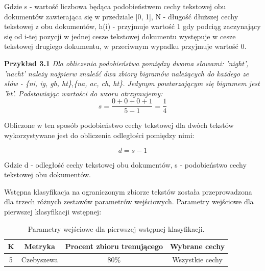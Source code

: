 \documentclass{classrep}
\begin{document}
Gdzie s - wartość liczbowa będąca podobieństwem cechy tekstowej obu dokumentów zawierająca się w przedziale [0, 1], N - długość dłuższej cechy tekstowej z obu dokumentów, h(i) - przyjmuje wartość 1 gdy podciąg zaczynający się od i-tej pozycji w jednej cesze tekstowej dokumentu występuje w cesze tekstowej drugiego dokumentu, w przeciwnym wypadku przyjmuje wartość 0.
\newline


\textbf{Przykład 3.1}\textit{
Dla obliczenia podobieństwa pomiędzy dwoma słowami: 'night', 'nacht' należy najpierw znaleźć dwa zbiory bigramów należących do każdego ze słów - \{ni, ig, gh, ht\},\{na, ac, ch, ht\}.
Jedynym powtarzającym się bigramem jest 'ht'. Podstawiając wartości do wzoru otrzymujemy:
\begin{equation} s = \frac {0 + 0 + 0 + 1}{5 - 1} = \frac{1}{4} \end{equation}
}

Obliczone w ten sposób podobieństwo cechy tekstowej dla dwóch tekstów wykorzystywane jest do obliczenia odległości pomiędzy nimi:

\begin{equation} d = s - 1 \end{equation}

Gdzie d - odległość cechy tekstowej obu dokumentów, s - podobieństwo cechy tekstowej obu dokumentów.\\
\newline





Wstępna klasyfikacja na ograniczonym zbiorze tekstów została przeprowadzona dla trzech różnych zestawów parametrów wejściowych. \newline
Parametry wejściowe dla pierwszej klasyfikacji wstępnej:
 
\begin{table}[h!]
\caption{Parametry wejściowe dla pierwszej wstępnej klasyfikacji. }
\centering
\vspace{0.1cm}
 \begin{tabular}{c c c c}
    \textbf{K} & \textbf{Metryka}   & \textbf{Procent zbioru trenującego}  & \textbf{Wybrane cechy}   \\
\hline
5 & Czebyszewa & 80\% & Wszystkie cechy \\
\end {tabular}
\label {Parametry wejściowe dla pierwszej wstępnej klasyfikacji. }
\end{table}
\newpage
\end{document}
